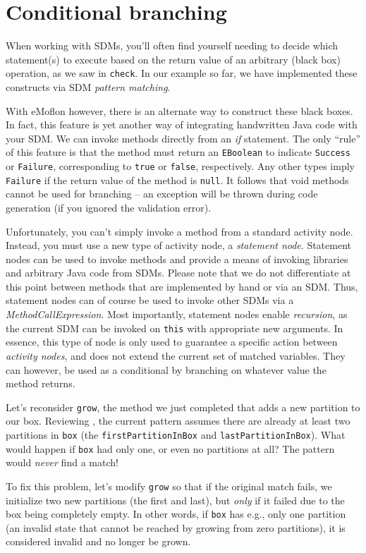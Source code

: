 \newpage
\hypertarget{sec:conBran}{}
\section{Conditional branching}
\genHeader

When working with SDMs, you'll often find yourself needing to decide which statement(s) to execute based on the return value of an arbitrary (black box)
operation, as we saw in \texttt{check}. In our example so far, we have implemented these constructs via SDM \emph{pattern matching}. 

With eMoflon however, there is an alternate way to construct these black boxes.
In fact, this feature is yet another way of integrating handwritten Java code with your SDM. We can invoke methods directly from an \emph{if} statement. The only ``rule'' of this feature is that the method must return an
\texttt{EBoolean} to indicate \texttt{Success} or \texttt{Failure}, corresponding to \texttt{true} or \texttt{false}, respectively. Any other types imply
\texttt{Failure} if the return value of the method is \texttt{null}. It follows that void methods cannot be used for branching -- an exception will be thrown
during code generation (if you ignored the validation error).

Unfortunately, you can't simply invoke a method from a standard activity node. Instead, you must use a new type of activity node, a \emph{statement
node}. Statement nodes can be used to invoke methods and provide a means of invoking libraries and
arbitrary Java code from SDMs. Please note that we do not differentiate at this point between methods that are implemented by hand or via an SDM. Thus,
statement nodes can of course be used to invoke other SDMs via a \emph{MethodCallExpression}. Most importantly, statement nodes enable \emph{recursion}, as the
current SDM can be invoked on \texttt{this} with appropriate new arguments. In essence, this type of node is only used to guarantee a specific action
between \emph{activity nodes}, and does not extend the current set of matched variables. They can however, be used as a conditional by branching on
whatever value the method returns.

Let's reconsider \texttt{grow}, the method we just completed that adds a new partition to our box. Reviewing , the current pattern assumes there are already at least two partitions in \texttt{box} (the
\texttt{firstPartitionInBox} and \texttt{lastPartitionInBox}). What would happen
if \texttt{box} had only one, or even no partitions at all? The pattern would \emph{never} find a match!

To fix this problem, let's modify \texttt{grow} so that if the original match fails, we initialize two new partitions (the first and last), but \emph{only} if
it failed due to the box being completely empty. In other words, if \texttt{box} has e.g., only one partition (an invalid state that cannot be reached by
growing from zero partitions), it is considered invalid and no longer be grown.






